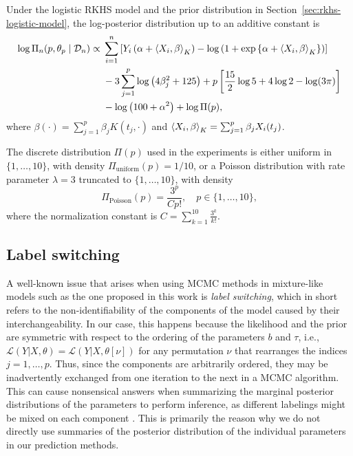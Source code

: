 \begin{proposition}
  Under the logistic RKHS model and the prior distribution in Section~\ref{sec:rkhs-logistic-model}, the log-posterior distribution up to an additive constant is
  \begin{align*}
    \log \Pi_n(p, \theta_p \mid \mathcal D_n) \propto {} & \sum_{i=1}^n \left[Y_i \left(\alpha + \left\langle X_i,\beta\right\rangle_K\right) - \log\left(1 + \exp\left\{\alpha +\left\langle X_i,\beta\right\rangle_K\right\}\right) \right]\\
     & - 3\sum_{j=1}^p \log\left(4\beta_j^2 + 125\right) + p \left[\frac{15}{2}\log 5 + 4 \log 2 - \log (3\pi)\right]\\
     & - \log\left(100 + \alpha^2\right) + \log \Pi(p),
  \end{align*}
  where \(\beta(\cdot)=\sum_{j=1}^p \beta_j K(t_j, \cdot)\) and \(\left\langle X_i,\beta\right\rangle_K = \sum_{j=1}^p \beta_j X_i(t_j)\).
\end{proposition}

The discrete distribution \(\Pi(p)\) used in the experiments is either uniform in \(\{1,\dots, 10\}\), with density \(\Pi_{\text{uniform}}(p)=1/10\), or a Poisson distribution with rate parameter \(\lambda=3\) truncated to \(\{1,\dots, 10\}\), with density
\[
\Pi_{\text{Poisson}}(p) = \frac{3^p}{Cp!}, \quad p\in\{1,\dots,10\},
\]
where the normalization constant is \(C = \sum_{k=1}^{10} \frac{3^k}{k!}\).

\subsection{Label switching}\label{app:label-switching}

A well-known issue that arises when using MCMC methods in mixture-like models such as the one proposed in this work is \textit{label switching}, which in short refers to the non-identifiability of the components of the model caused by their interchangeability. In our case, this happens because the likelihood and the prior are symmetric with respect to the ordering of the parameters \(b\) and \(\tau\), i.e., \(\mathcal L(Y|X,\theta)=\mathcal L(Y|X, \theta[\nu])\) for any permutation \(\nu\) that rearranges the indices \(j=1,\dots, p\). Thus, since the components are arbitrarily ordered, they may be inadvertently exchanged from one iteration to the next in a MCMC algorithm. This can cause nonsensical answers when summarizing the marginal posterior distributions of the parameters to perform inference, as different labelings might be mixed on each component \citep{stephens2000dealing}. This is primarily the reason why we do not directly use summaries of the posterior distribution of the individual parameters in our prediction methods.

